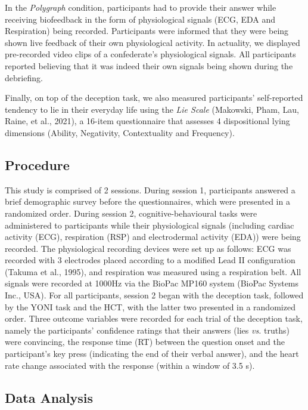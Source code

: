 \documentclass[
  man,mask,floatsintext]{apa6}
\begin{document}
In the \emph{Polygraph} condition, participants had to provide their answer while receiving biofeedback in the form of physiological signals (ECG, EDA and Respiration) being recorded. Participants were informed that they were being shown live feedback of their own physiological activity. In actuality, we displayed pre-recorded video clips of a confederate's physiological signals. All participants reported believing that it was indeed their own signals being shown during the debriefing.

Finally, on top of the deception task, we also measured participants' self-reported tendency to lie in their everyday life using the \emph{Lie Scale} (Makowski, Pham, Lau, Raine, et al., 2021), a 16-item questionnaire that assesses 4 dispositional lying dimensions (Ability, Negativity, Contextuality and Frequency).

\hypertarget{procedure}{%
\subsection{Procedure}\label{procedure}}

This study is comprised of 2 sessions. During session 1, participants answered a brief demographic survey before the questionnaires, which were presented in a randomized order. During session 2, cognitive-behavioural tasks were administered to participants while their physiological signals (including cardiac activity (ECG), respiration (RSP) and electrodermal activity (EDA)) were being recorded. The physiological recording devices were set up as follows: ECG was recorded with 3 electrodes placed according to a modified Lead II configuration (Takuma et al., 1995), and respiration was measured using a respiration belt. All signals were recorded at 1000Hz via the BioPac MP160 system (BioPac Systems Inc., USA). For all participants, session 2 began with the deception task, followed by the YONI task and the HCT, with the latter two presented in a randomized order. Three outcome variables were recorded for each trial of the deception task, namely the participants' confidence ratings that their answers (lies \emph{vs.} truths) were convincing, the response time (RT) between the question onset and the participant's key press (indicating the end of their verbal answer), and the heart rate change associated with the response (within a window of 3.5 s).

\hypertarget{data-analysis}{%
\subsection{Data Analysis}\label{data-analysis}}
\end{document}
